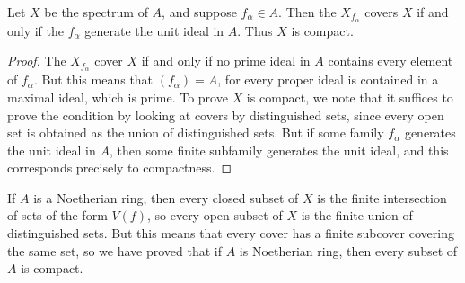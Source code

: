 \begin{lemma}
    Let $X$ be the spectrum of $A$, and suppose $f_\alpha \in A$. Then the $X_{f_\alpha}$ covers $X$ if and only if the $f_\alpha$ generate the unit ideal in $A$. Thus $X$ is compact.
\end{lemma}
\begin{proof}
    The $X_{f_\alpha}$ cover $X$ if and only if no prime ideal in $A$ contains every element of $f_\alpha$. But this means that $(f_\alpha) = A$, for every proper ideal is contained in a maximal ideal, which is prime. To prove $X$ is compact, we note that it suffices to prove the condition by looking at covers by distinguished sets, since every open set is obtained as the union of distinguished sets. But if some family $f_\alpha$ generates the unit ideal in $A$, then some finite subfamily generates the unit ideal, and this corresponds precisely to compactness.
\end{proof}

If $A$ is a Noetherian ring, then every closed subset of $X$ is the finite intersection of sets of the form $V(f)$, so every open subset of $X$ is the finite union of distinguished sets. But this means that every cover has a finite subcover covering the same set, so we have proved that if $A$ is Noetherian ring, then every subset of $A$ is compact.

